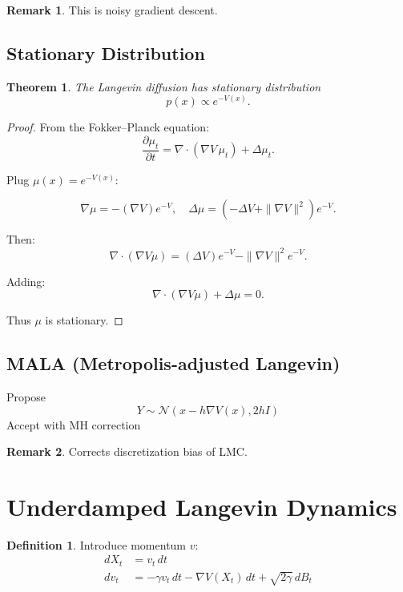 \documentclass[12pt,oneside]{book}
\numberwithin{equation}{section}
\theoremstyle{definition}
\newtheorem{definition}{Definition}[section]
\newtheorem{remark}{Remark}[section]
\theoremstyle{plain}
\newtheorem{theorem}{Theorem}[section]
\theoremstyle{remark}
\newcommand{\Normal}{\mathcal{N}}
\begin{document}
\begin{remark}
This is noisy gradient descent.
\end{remark}


\subsection*{Stationary Distribution}

\begin{theorem}
The Langevin diffusion has stationary distribution
\[
p(x) \propto e^{-V(x)}.
\]
\end{theorem}

\begin{proof}
From the Fokker--Planck equation:
\[
\frac{\partial \mu_t}{\partial t}
=
\nabla \cdot (\nabla V \,\mu_t) + \Delta \mu_t.
\]

Plug $\mu(x) = e^{-V(x)}$:

\[
\nabla \mu = -(\nabla V)e^{-V}, \quad
\Delta \mu = \left(-\Delta V + \|\nabla V\|^2\right)e^{-V}.
\]

Then:
\[
\nabla \cdot (\nabla V \mu)
=
(\Delta V)e^{-V} - \|\nabla V\|^2 e^{-V}.
\]

Adding:
\[
\nabla \cdot (\nabla V \mu) + \Delta \mu = 0.
\]

Thus $\mu$ is stationary.
\end{proof}


\subsection{MALA (Metropolis-adjusted Langevin)}

\begin{algorithm}
\caption{MALA}
\begin{algorithmic}
\State Propose
\[
Y \sim \Normal(x - h \nabla V(x), 2hI)
\]
\State Accept with MH correction
\end{algorithmic}
\end{algorithm}

\begin{remark}
Corrects discretization bias of LMC.
\end{remark}


\section{Underdamped Langevin Dynamics}

\begin{definition}
Introduce momentum $v$:
\[
\begin{aligned}
dX_t &= v_t\,dt \\
dv_t &= -\gamma v_t\,dt - \nabla V(X_t)\,dt + \sqrt{2\gamma}\,dB_t
\end{aligned}
\]
\end{definition}
\end{document}
